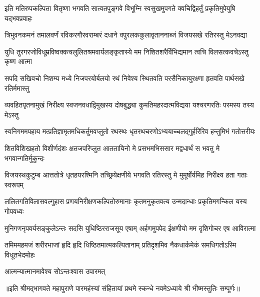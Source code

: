 

\twolineshloka
{इति मतिरुपकल्पिता वितृष्णा भगवति सात्वतपुङ्गवे विभूम्नि}
{स्वसुखमुपगते क्वचिद्विहर्तुं प्रकृतिमुपेयुषि यद्भवप्रवाहः}

\twolineshloka
{त्रिभुवनकमनं तमालवर्णं रविकरगौरवराम्बरं दधाने}
{वपुरलककुलावृताननाब्जं विजयसखे रतिरस्तु मेऽनवद्या}

\twolineshloka
{युधि तुरगरजोविधूम्रविष्वक्कचलुलितश्रमवार्यलङ्कृतास्ये}
{मम निशितशरैर्विभिद्यमान त्वचि विलसत्कवचेऽस्तु कृष्ण आत्मा}

\twolineshloka
{सपदि सखिवचो निशम्य मध्ये निजपरयोर्बलयो रथं निवेश्य}
{स्थितवति परसैनिकायुरक्ष्णा हृतवति पार्थसखे रतिर्ममास्तु}

\twolineshloka
{व्यवहितपृतनामुखं निरीक्ष्य स्वजनवधाद्विमुखस्य दोषबुद्ध्या}
{कुमतिमहरदात्मविद्यया यश्चरणरतिः परमस्य तस्य मेऽस्तु}

\twolineshloka
{स्वनिगममपहाय मत्प्रतिज्ञामृतमधिकर्तुमवप्लुतो रथस्थः}
{धृतरथचरणोऽभ्ययाच्चलद्गुर्हरिरिव हन्तुमिभं गतोत्तरीयः}

\twolineshloka
{शितविशिखहतो विशीर्णदंशः क्षतजपरिप्लुत आततायिनो मे}
{प्रसभमभिससार मद्वधार्थं स भवतु मे भगवान्गतिर्मुकुन्दः}

\twolineshloka
{विजयरथकुटुम्ब आत्ततोत्रे धृतहयरश्मिनि तच्छ्रियेक्षणीये}
{भगवति रतिरस्तु मे मुमूर्षोर्यमिह निरीक्ष्य हता गताः स्वरूपम्}

\twolineshloka
{ललितगतिविलासवल्गुहास प्रणयनिरीक्षणकल्पितोरुमानाः}
{कृतमनुकृतवत्य उन्मदान्धाः प्रकृतिमगन्किल यस्य गोपवध्वः}

\twolineshloka
{मुनिगणनृपवर्यसङ्कुलेऽन्तः सदसि युधिष्ठिरराजसूय एषाम्}
{अर्हणमुपपेद ईक्षणीयो मम दृशिगोचर एष आविरात्मा}

\twolineshloka
{तमिममहमजं शरीरभाजां हृदि हृदि धिष्ठितमात्मकल्पितानाम्}
{प्रतिदृशमिव नैकधार्कमेकं समधिगतोऽस्मि विधूतभेदमोहः}

{आत्मन्यात्मानमावेश्य सोऽन्तःश्वास उपारमत्}

{॥इति श्रीमद्भागवते महापुराणे पारमहंस्यां संहितायां प्रथमे स्कन्धे नवमेऽध्याये श्री भीष्मस्तुतिः सम्पूर्णः॥}
